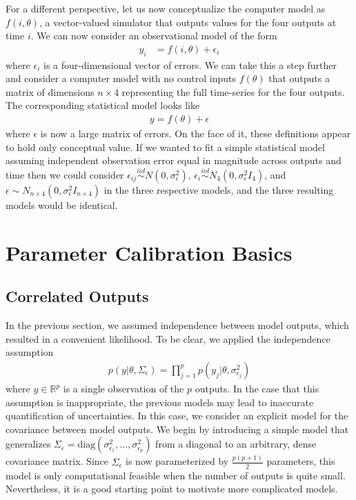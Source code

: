 \documentclass[12pt]{article}
\newcommand{\R}{\mathbb{R}}
\begin{document}
For a different perspective, let us now conceptualize the computer model as $f(i, \theta)$, a vector-valued simulator that outputs values for the four outputs
at time $i$. We can now consider an observational model of the form 
\begin{align}
y_{i} &= f(i, \theta) + \epsilon_{i}
\end{align}
where $\epsilon_{i}$ is a four-dimensional vector of errors. We can take this a step further and consider a computer model with no control inputs
$f(\theta)$ that outputs a matrix of dimensions $n \times 4$ representing the full time-series for the four outputs. The corresponding statistical model looks 
like
\begin{align}
y = f(\theta) + \epsilon
\end{align}
where $\epsilon$ is now a large matrix of errors. On the face of it, these definitions appear to hold only conceptual value. If we wanted to fit a simple 
statistical model assuming independent observation error equal in magnitude across outputs and time then we could consider 
$\epsilon_{ij} \overset{iid}{\sim} N(0, \sigma_\epsilon^2)$, 
$\epsilon_i \overset{iid}{\sim} N_4(0, \sigma_\epsilon^2 I_4)$, and $\epsilon \sim N_{n \times 4}(0, \sigma_\epsilon^2 I_{n \times 4})$ 
in the three respective models, and the three resulting models would be identical. 


\section{Parameter Calibration Basics}
\subsection{Correlated Outputs}
In the previous section, we assumed independence between model outputs, which resulted in a convenient likelihood. To be clear, we applied the independence assumption
\begin{align}
p(y|\theta, \Sigma_\epsilon) = \prod_{j = 1}^{p} p(y_j|\theta, \sigma_{\epsilon_j}^2)
\end{align}
where $y \in \R^p$ is a single observation of the $p$ outputs. In the case that this assumption is inappropriate, the previous models may lead to inaccurate 
quantification of uncertainties. In this case, we consider an explicit model for the covariance between model outputs. We begin by introducing a simple model 
that generalizes $\Sigma_\epsilon = \text{diag}\left(\sigma_{\epsilon_1}^2, \dots, \sigma_{\epsilon_p}^2\right)$ from a diagonal to an arbitrary, dense covariance 
matrix. Since $\Sigma_\epsilon$ is now parameterized by $\frac{p(p+1)}{2}$ parameters, this model is only computational feasible when the number of outputs is 
quite small. Nevertheless, it is a good starting point to motivate more complicated models. 
\end{document}
